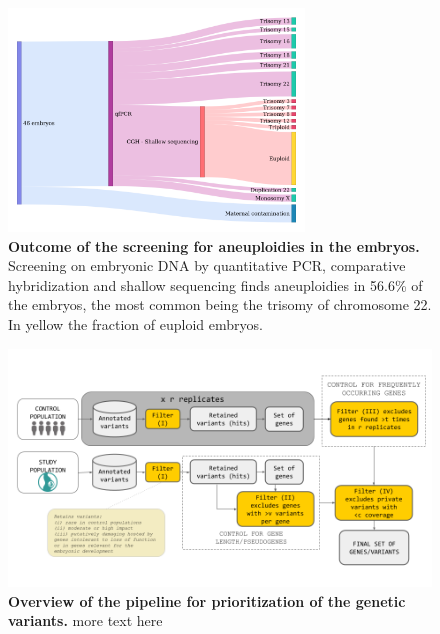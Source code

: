 
\begin{figure}[h]
\centering
\includegraphics[width=0.7\textwidth]{fig/ibelieve.png}
\caption{\textbf{Outcome of the screening for aneuploidies in the embryos.} Screening on embryonic DNA by quantitative PCR, comparative hybridization and shallow sequencing finds aneuploidies in  56.6\% of the embryos, the most common being the trisomy of chromosome 22. In yellow the fraction of euploid embryos. }
\label{fig:presequencing}
\end{figure}

\begin{figure}[ht]
\centering
\includegraphics[width=\linewidth]{fig/pipeonly.png}
\caption{\textbf{Overview of the pipeline for prioritization of the genetic variants.} more text here } 
\label{fig:pipeline}
\end{figure}


